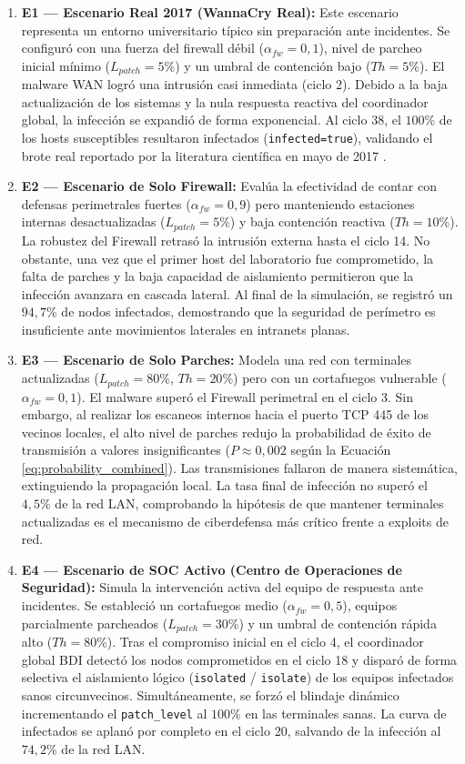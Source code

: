 \begin{enumerate}
    \item \textbf{E1 — Escenario Real 2017 (WannaCry Real):} Este escenario representa un entorno universitario típico sin preparación ante incidentes. Se configuró con una fuerza del firewall débil ($\alpha_{fw} = 0,1$), nivel de parcheo inicial mínimo ($L_{patch} = 5\%$) y un umbral de contención bajo ($Th = 5\%$). El malware WAN logró una intrusión casi inmediata (ciclo 2). Debido a la baja actualización de los sistemas y la nula respuesta reactiva del coordinador global, la infección se expandió de forma exponencial. Al ciclo 38, el $100\%$ de los hosts susceptibles resultaron infectados (\texttt{infected}\allowbreak\texttt{=}\allowbreak\texttt{true}), validando el brote real reportado por la literatura científica en mayo de 2017 \cite{enisa2017wannacry}.
    \item \textbf{E2 — Escenario de Solo Firewall:} Evalúa la efectividad de contar con defensas perimetrales fuertes ($\alpha_{fw} = 0,9$) pero manteniendo estaciones internas desactualizadas ($L_{patch} = 5\%$) y baja contención reactiva ($Th = 10\%$). La robustez del Firewall retrasó la intrusión externa hasta el ciclo 14. No obstante, una vez que el primer host del laboratorio fue comprometido, la falta de parches y la baja capacidad de aislamiento permitieron que la infección avanzara en cascada lateral. Al final de la simulación, se registró un $94,7\%$ de nodos infectados, demostrando que la seguridad de perímetro es insuficiente ante movimientos laterales en intranets planas.
    \item \textbf{E3 — Escenario de Solo Parches:} Modela una red con terminales actualizadas ($L_{patch} = 80\%$, $Th = 20\%$) pero con un cortafuegos vulnerable ($\alpha_{fw} = 0,1$). El malware superó el Firewall perimetral en el ciclo 3. Sin embargo, al realizar los escaneos internos hacia el puerto TCP 445 de los vecinos locales, el alto nivel de parches redujo la probabilidad de éxito de transmisión a valores insignificantes ($P \approx 0,002$ según la Ecuación \ref{eq:probability_combined}). Las transmisiones fallaron de manera sistemática, extinguiendo la propagación local. La tasa final de infección no superó el $4,5\%$ de la red LAN, comprobando la hipótesis de que mantener terminales actualizadas es el mecanismo de ciberdefensa más crítico frente a exploits de red.
    \item \textbf{E4 — Escenario de SOC Activo (Centro de Operaciones de Seguridad):} Simula la intervención activa del equipo de respuesta ante incidentes. Se estableció un cortafuegos medio ($\alpha_{fw} = 0,5$), equipos parcialmente parcheados ($L_{patch} = 30\%$) y un umbral de contención rápida alto ($Th = 80\%$). Tras el compromiso inicial en el ciclo 4, el coordinador global BDI detectó los nodos comprometidos en el ciclo 18 y disparó de forma selectiva el aislamiento lógico (\texttt{isolated} / \texttt{isolate}) de los equipos infectados sanos circunvecinos. Simultáneamente, se forzó el blindaje dinámico incrementando el \texttt{patch\_level} al $100\%$ en las terminales sanas. La curva de infectados se aplanó por completo en el ciclo 20, salvando de la infección al $74,2\%$ de la red LAN.

\end{enumerate}
